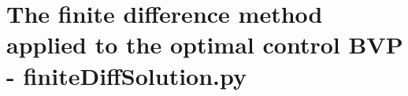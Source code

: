 
\chapter{The finite difference method applied to the optimal control BVP -  finiteDiffSolution.py} %

\label{AppendixF} %









